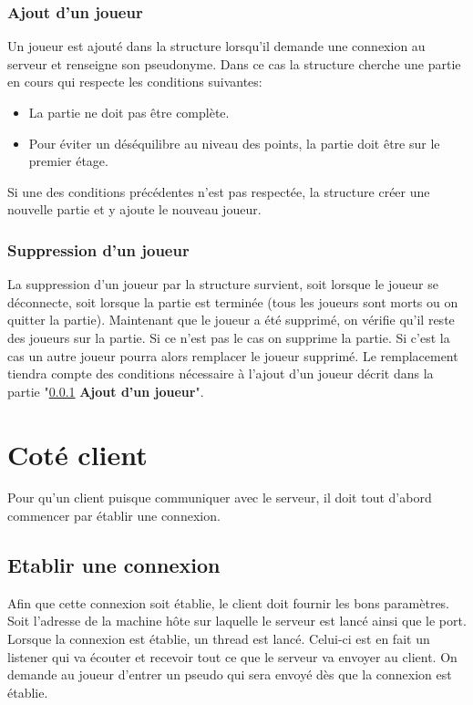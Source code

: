 \documentclass[a4paper,10pt]{article}
\begin{document}
	\subsubsection{Ajout d'un joueur}
	\label{subsubAddPlayer}
		Un joueur est ajouté dans la structure lorsqu'il demande une connexion au serveur et renseigne son pseudonyme. Dans ce cas la structure cherche une
partie en cours qui respecte les conditions suivantes:
		\begin{itemize}
			\item La partie ne doit pas être complète.
			\item Pour éviter un déséquilibre au niveau des points, la partie doit être sur le premier étage.
		\end{itemize}
		Si une des conditions précédentes n'est pas respectée, la structure créer une nouvelle partie et y ajoute le nouveau joueur.

	\subsubsection{Suppression d'un joueur}
		La suppression d'un joueur par la structure survient, soit lorsque le joueur se déconnecte, soit lorsque la partie est terminée (tous les joueurs sont
morts ou on quitter la partie).
		Maintenant que le joueur a été supprimé, on vérifie qu'il reste des joueurs sur la partie. Si ce n'est pas le cas on supprime la partie. Si c'est la
cas un autre joueur pourra alors remplacer le joueur supprimé. Le remplacement tiendra compte des conditions nécessaire à l'ajout d'un joueur décrit dans la
partie "\ref{subsubAddPlayer} \textbf{Ajout d'un joueur}".


	\newpage
	\section{Coté client}
	Pour qu'un client puisque communiquer avec le serveur, il doit tout d'abord commencer par établir une connexion.

	\subsection{Etablir une connexion}
	Afin que cette connexion soit établie, le client doit fournir les bons paramètres. Soit l'adresse de la machine hôte sur laquelle le serveur est lancé
	ainsi	que le port. Lorsque la connexion est établie, un thread est lancé. Celui-ci est en fait un listener qui va écouter et recevoir tout ce que le
serveur	va	envoyer au client.
	On demande au joueur d'entrer un pseudo qui sera envoyé dès que la connexion est établie.
\end{document}
